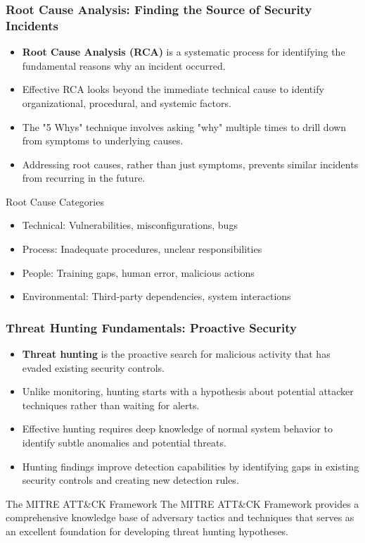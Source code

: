 \documentclass{beamer}
\begin{document}
\begin{frame}
\frametitle{Root Cause Analysis: Finding the Source of Security Incidents}
\begin{itemize}
\item \textbf{Root Cause Analysis (RCA)} is a systematic process for identifying the fundamental reasons why an incident occurred.
\item Effective RCA looks beyond the immediate technical cause to identify organizational, procedural, and systemic factors.
\item The "5 Whys" technique involves asking "why" multiple times to drill down from symptoms to underlying causes.
\item Addressing root causes, rather than just symptoms, prevents similar incidents from recurring in the future.
\end{itemize}

\begin{block}{Root Cause Categories}
\scriptsize
\begin{itemize}
\item Technical: Vulnerabilities, misconfigurations, bugs
\item Process: Inadequate procedures, unclear responsibilities
\item People: Training gaps, human error, malicious actions
\item Environmental: Third-party dependencies, system interactions
\end{itemize}
\end{block}
\end{frame}

\begin{frame}
\frametitle{Threat Hunting Fundamentals: Proactive Security}
\begin{itemize}
\item \textbf{Threat hunting} is the proactive search for malicious activity that has evaded existing security controls.
\item Unlike monitoring, hunting starts with a hypothesis about potential attacker techniques rather than waiting for alerts.
\item Effective hunting requires deep knowledge of normal system behavior to identify subtle anomalies and potential threats.
\item Hunting findings improve detection capabilities by identifying gaps in existing security controls and creating new detection rules.
\end{itemize}

\begin{alertblock}{The MITRE ATT\&CK Framework}
\scriptsize
The MITRE ATT\&CK Framework provides a comprehensive knowledge base of adversary tactics and techniques that serves as an excellent foundation for developing threat hunting hypotheses.
\end{alertblock}
\end{frame}
\end{document}
